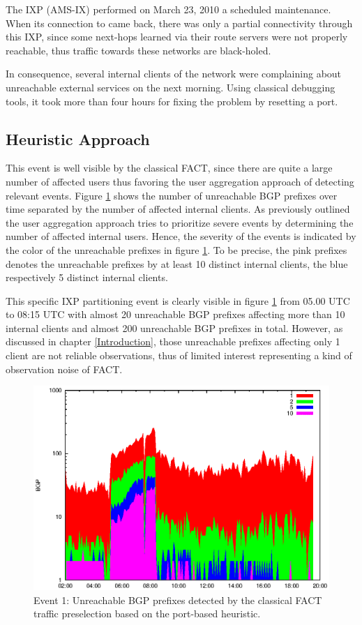 The IXP \citet{AMS-IX}(AMS-IX) performed on March 23, 2010 a scheduled maintenance. When its connection to \citet{switch} came back, there was only a partial connectivity through this IXP, since some next-hops learned via their route servers were not properly reachable, thus traffic towards these networks are black-holed.\citep{SchatzmannPAM2011}

In consequence, several internal clients of the \citet{switch} network were complaining about unreachable external services on the next morning. Using classical debugging tools, it took more than four hours for fixing the problem by resetting a port.\citep{SchatzmannPAM2011}

\subsection{Heuristic Approach}
This event is well visible by the classical FACT, since there are quite a large number of affected users thus favoring the user aggregation approach of detecting relevant events. Figure \ref{fig:AMS_IX_FACT_REF} shows the number of unreachable BGP prefixes over time separated by the number of affected internal clients. As previously outlined the user aggregation approach tries to prioritize severe events by determining the number of affected internal users. Hence, the severity of the events is indicated by the color of the unreachable prefixes in figure \ref{fig:AMS_IX_FACT_REF}. To be precise, the pink prefixes denotes the unreachable prefixes by at least 10 distinct internal clients, the blue respectively 5 distinct internal clients.

This specific IXP partitioning event is clearly visible in figure  \ref{fig:AMS_IX_FACT_REF} from 05.00 UTC to 08:15 UTC with almost 20 unreachable BGP prefixes affecting more than 10 internal clients and almost 200 unreachable BGP prefixes in total. However, as discussed in chapter \ref{Introduction}, those unreachable prefixes affecting only 1 client are not reliable observations, thus of limited interest representing a kind of observation noise of FACT.

\begin{figure}
	[p] \centering 
	\includegraphics[width=0.75\linewidth]{images/events/2010_03_25/bgp_log_port80_ref.eps}
	\caption{Event 1: Unreachable BGP prefixes detected by the classical FACT traffic preselection based on the port-based heuristic.} 
	\label{fig:AMS_IX_FACT_REF} 
\end{figure}


